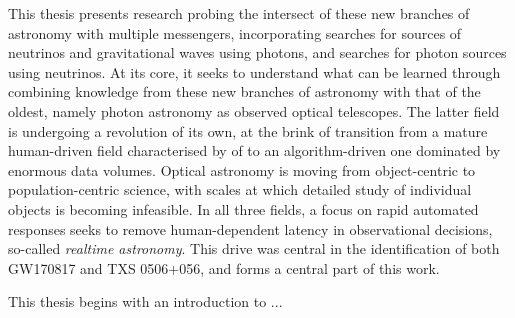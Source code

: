 This thesis presents research probing the intersect of these new branches of astronomy with multiple messengers, incorporating searches for sources of neutrinos and gravitational waves using photons, and searches for photon sources using neutrinos. At its core, it seeks to understand what can be learned through combining knowledge from these new branches of astronomy with that of the oldest, namely photon astronomy as observed optical telescopes. The latter field is undergoing a revolution of its own, at the brink of transition from a mature human-driven field characterised by  of to an algorithm-driven one dominated by enormous data volumes. Optical astronomy is moving from object-centric to population-centric science, with scales at which detailed study of individual objects is becoming infeasible. In all three fields, a focus on rapid automated responses seeks to remove human-dependent latency in observational decisions, so-called \emph{realtime astronomy}. This drive was central in the identification of both GW170817 and TXS 0506+056, and forms a central part of this work.

This thesis begins with an introduction to ...




